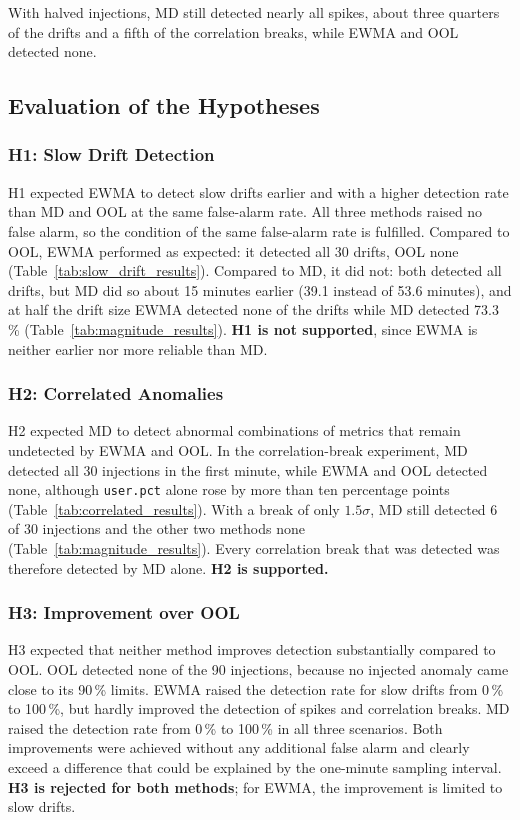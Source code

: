 With halved injections, MD still detected nearly all spikes, about three quarters of the drifts and a fifth of the correlation breaks, while EWMA and OOL detected none.

\subsection{Evaluation of the Hypotheses}

\subsubsection{H1: Slow Drift Detection}
H1 expected EWMA to detect slow drifts earlier and with a higher detection rate than MD and OOL at the same false-alarm rate. All three methods raised no false alarm, so the condition of the same false-alarm rate is fulfilled. Compared to OOL, EWMA performed as expected: it detected all 30 drifts, OOL none (Table~\ref{tab:slow_drift_results}). Compared to MD, it did not: both detected all drifts, but MD did so about 15 minutes earlier (39.1 instead of 53.6 minutes), and at half the drift size EWMA detected none of the drifts while MD detected 73.3\,\% (Table~\ref{tab:magnitude_results}). \textbf{H1 is not supported}, since EWMA is neither earlier nor more reliable than MD.

\subsubsection{H2: Correlated Anomalies}
H2 expected MD to detect abnormal combinations of metrics that remain undetected by EWMA and OOL. In the correlation-break experiment, MD detected all 30 injections in the first minute, while EWMA and OOL detected none, although \texttt{user.pct} alone rose by more than ten percentage points (Table~\ref{tab:correlated_results}). With a break of only $1.5\sigma$, MD still detected 6 of 30 injections and the other two methods none (Table~\ref{tab:magnitude_results}). Every correlation break that was detected was therefore detected by MD alone. \textbf{H2 is supported.}

\subsubsection{H3: Improvement over OOL}
H3 expected that neither method improves detection substantially compared to OOL. OOL detected none of the 90 injections, because no injected anomaly came close to its 90\,\% limits. EWMA raised the detection rate for slow drifts from 0\,\% to 100\,\%, but hardly improved the detection of spikes and correlation breaks. MD raised the detection rate from 0\,\% to 100\,\% in all three scenarios. Both improvements were achieved without any additional false alarm and clearly exceed a difference that could be explained by the one-minute sampling interval. \textbf{H3 is rejected for both methods}; for EWMA, the improvement is limited to slow drifts.


